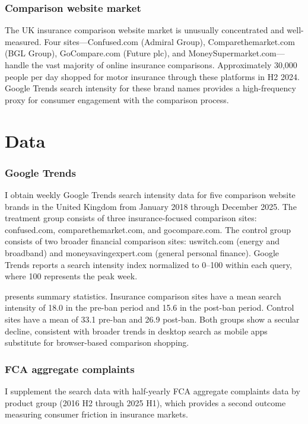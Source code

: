 \documentclass[12pt]{article}
\begin{document}
\subsubsection*{Comparison website market} The UK insurance comparison website market is unusually concentrated and well-measured. Four sites---Confused.com (Admiral Group), Comparethemarket.com (BGL Group), GoCompare.com (Future plc), and MoneySupermarket.com---handle the vast majority of online insurance comparisons. Approximately 30,000 people per day shopped for motor insurance through these platforms in H2 2024. Google Trends search intensity for these brand names provides a high-frequency proxy for consumer engagement with the comparison process.

\section{Data}
\label{sec:data}

\subsubsection*{Google Trends} I obtain weekly Google Trends search intensity data for five comparison website brands in the United Kingdom from January 2018 through December 2025. The treatment group consists of three insurance-focused comparison sites: confused.com, comparethemarket.com, and gocompare.com. The control group consists of two broader financial comparison sites: uswitch.com (energy and broadband) and moneysavingexpert.com (general personal finance). Google Trends reports a search intensity index normalized to 0--100 within each query, where 100 represents the peak week.

 presents summary statistics. Insurance comparison sites have a mean search intensity of 18.0 in the pre-ban period and 15.6 in the post-ban period. Control sites have a mean of 33.1 pre-ban and 26.9 post-ban. Both groups show a secular decline, consistent with broader trends in desktop search as mobile apps substitute for browser-based comparison shopping.

\subsubsection*{FCA aggregate complaints} I supplement the search data with half-yearly FCA aggregate complaints data by product group (2016 H2 through 2025 H1), which provides a second outcome measuring consumer friction in insurance markets.
\end{document}
